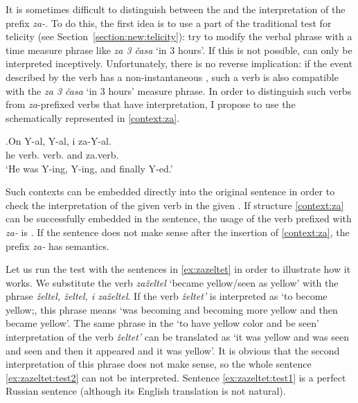 It is sometimes difficult to distinguish between the  and the  interpretation of the prefix \textit{za-}. To do this, the first idea is to use a part of the traditional test for telicity (see Section~\ref{section:new:telicity}): try to modify the verbal phrase with a time measure phrase like \textit{za 3 \v{c}asa} `in 3 hours'. If this is not possible, can only be interpreted inceptively. Unfortunately, there is no reverse implication: if the event described by the  verb has a non-instantaneous , such a verb is also compatible with the \textit{za 3 \v{c}asa} `in 3 hours' measure phrase. In order to distinguish such verbs from \textit{za}-prefixed verbs that have  interpretation, I propose to use the  schematically represented in \ref{context:za}.

\exg.\label{context:za}On Y-al, Y-al, i za-Y-al.\\
he verb. verb. and za.verb.\\
\trans `He was Y-ing, Y-ing, and finally Y-ed.'

Such contexts can be embedded directly into the original sentence in order to check the interpretation of the given verb in the given . If structure \ref{context:za} can be successfully embedded in the sentence, the usage of the verb prefixed with \textit{za-} is . If the sentence does not make sense after the insertion of  \ref{context:za}, the prefix \textit{za-} has  semantics.

Let us run the test with the sentences in \ref{ex:zazeltet} in order to illustrate how it works. We substitute the verb \textit{za\v{z}eltel} `became yellow/seen as yellow' with the phrase \textit{\v{z}eltel, \v{z}eltel, i za\v{z}eltel}. If the verb \textit{\v{z}eltet'} is interpreted as `to become yellow;, this phrase means `was becoming and becoming more yellow and then became yellow'. The same phrase in the `to have yellow color and be seen' interpretation of the verb \textit{\v{z}eltet'} can be translated as `it was yellow and was seen and seen and then it appeared and it was yellow'. It is obvious that the second interpretation of this phrase does not make sense, so the whole sentence \ref{ex:zazeltet:test2} can not be interpreted. Sentence \ref{ex:zazeltet:test1} is a perfect Russian sentence (although its English translation is not natural).

